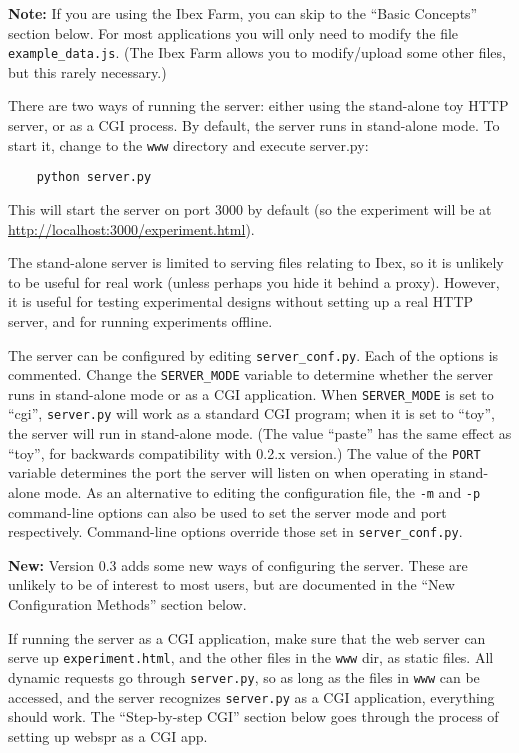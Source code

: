 \documentclass[]{article}
\begin{document}
\textbf{Note:} If you are using the Ibex Farm, you can skip to the
``Basic Concepts'' section below. For most applications you will only
need to modify the file \texttt{example\_data.js}. (The Ibex Farm allows
you to modify/upload some other files, but this rarely necessary.)

There are two ways of running the server: either using the stand-alone
toy HTTP server, or as a CGI process. By default, the server runs in
stand-alone mode. To start it, change to the \texttt{www} directory and
execute server.py:

\begin{verbatim}
    python server.py
\end{verbatim}

This will start the server on port 3000 by default (so the experiment
will be at \url{http://localhost:3000/experiment.html}).

The stand-alone server is limited to serving files relating to Ibex, so
it is unlikely to be useful for real work (unless perhaps you hide it
behind a proxy). However, it is useful for testing experimental designs
without setting up a real HTTP server, and for running experiments
offline.

The server can be configured by editing \texttt{server\_conf.py}. Each
of the options is commented. Change the \texttt{SERVER\_MODE} variable
to determine whether the server runs in stand-alone mode or as a CGI
application. When \texttt{SERVER\_MODE} is set to ``cgi'',
\texttt{server.py} will work as a standard CGI program; when it is set
to ``toy'', the server will run in stand-alone mode. (The value
``paste'' has the same effect as ``toy'', for backwards compatibility
with 0.2.x version.) The value of the \texttt{PORT} variable determines
the port the server will listen on when operating in stand-alone mode.
As an alternative to editing the configuration file, the \texttt{-m} and
\texttt{-p} command-line options can also be used to set the server mode
and port respectively. Command-line options override those set in
\texttt{server\_conf.py}.

\textbf{New:} Version 0.3 adds some new ways of configuring the server.
These are unlikely to be of interest to most users, but are documented
in the ``New Configuration Methods'' section below.

If running the server as a CGI application, make sure that the web
server can serve up \texttt{experiment.html}, and the other files in the
\texttt{www} dir, as static files. All dynamic requests go through
\texttt{server.py}, so as long as the files in \texttt{www} can be
accessed, and the server recognizes \texttt{server.py} as a CGI
application, everything should work. The ``Step-by-step CGI'' section
below goes through the process of setting up webspr as a CGI app.
\end{document}

